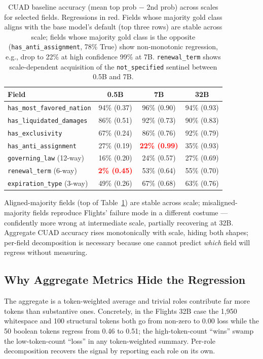 \documentclass{article}
\newcommand{\regress}[1]{\textcolor{red}{\textbf{#1}}}
\begin{document}
\begin{table}[h]
\centering
\small
\begin{tabular}{lccc}
\toprule
\textbf{Field} & \textbf{0.5B} & \textbf{7B} & \textbf{32B} \\
\midrule
\texttt{has\_most\_favored\_nation}  & 94\% (0.37) & 96\% (0.90) & 94\% (0.93) \\
\texttt{has\_liquidated\_damages}    & 86\% (0.51) & 92\% (0.73) & 90\% (0.83) \\
\texttt{has\_exclusivity}            & 67\% (0.24) & 86\% (0.76) & 92\% (0.79) \\
\texttt{has\_anti\_assignment}       & 27\% (0.19) & \regress{22\% (0.99)} & 35\% (0.93) \\
\texttt{governing\_law} (12-way)     & 16\% (0.20) & 24\% (0.57) & 27\% (0.69) \\
\texttt{renewal\_term} (6-way)       & \regress{2\% (0.45)} & 53\% (0.64) & 55\% (0.70) \\
\texttt{expiration\_type} (3-way)    & 49\% (0.26) & 67\% (0.68) & 63\% (0.76) \\
\bottomrule
\end{tabular}
\caption{CUAD baseline accuracy (mean top prob $-$ 2nd prob) across scales for selected fields. Regressions in red. Fields whose majority gold class aligns with the base model's default (top three rows) are stable across scale; fields whose majority gold class is the opposite (\texttt{has\_anti\_assignment}, 78\% True) show non-monotonic regression, e.g., drop to 22\% at high confidence 99\% at 7B. \texttt{renewal\_term} shows scale-dependent acquisition of the \texttt{not\_specified} sentinel between 0.5B and 7B.}
\label{tab:cuad_per_field_scale}
\end{table}

Aligned-majority fields (top of Table~\ref{tab:cuad_per_field_scale}) are stable across scale; misaligned-majority fields reproduce Flights' failure mode in a different costume --- confidently more wrong at intermediate scale, partially recovering at 32B. Aggregate CUAD accuracy rises monotonically with scale, hiding both shapes; per-field decomposition is necessary because one cannot predict \emph{which} field will regress without measuring.

\subsection{Why Aggregate Metrics Hide the Regression}

The aggregate is a token-weighted average and trivial roles contribute far more tokens than substantive ones. Concretely, in the Flights 32B case the 1,950 whitespace and 100 structural tokens both go from non-zero to 0.00 loss while the 50 boolean tokens regress from 0.46 to 0.51; the high-token-count ``wins'' swamp the low-token-count ``loss'' in any token-weighted summary. Per-role decomposition recovers the signal by reporting each role on its own.
\end{document}
